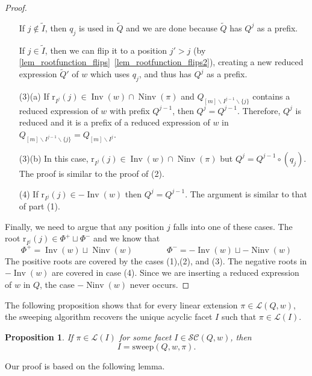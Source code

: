 \documentclass{amsart}
\newtheorem{proposition}[theorem]{Proposition}
\theoremstyle{definition}
\DeclareMathOperator{\Inv}{Inv} %
\DeclareMathOperator{\Ninv}{Ninv} %
\newcommand{\linearExtensions}{\mathcal{L}} %
\newcommand{\subwordComplex}{\mathcal{SC}} %
\newcommand{\rootFunction}[2]{\mathrm{r}_{#1}(#2)} %
\newcommand{\sweepingAlgorithm}{\mathrm{sweep}} %
\begin{document}
\begin{proof}
\begin{enumerate}
    If $j\notin \widetilde I$, then $q_j$ is used in $\widetilde Q$ and we are done because $\widetilde Q$ has $Q^j$ as a prefix.

    If $j\in \widetilde I$, then we can flip it to a position $j'>j$ (by \cref{lem_rootfunction_flips}~\eqref{lem_rootfunction_flips2}), creating a new reduced expression $\widetilde Q'$ of $w$ which uses $q_j$, and thus has $Q^j$ as a prefix.


    \item[(3)(a)] If $\rootFunction{I^j}{j}\in \Inv(w) \cap \Ninv (\pi)$ and $Q_{[m]\smallsetminus I^{j-1}\smallsetminus \{j\}}$ contains a reduced expression of $w$ with prefix $Q^{j-1}$, then $Q^j=Q^{j-1}$.
    Therefore, $Q^j$ is reduced and it is a prefix of a reduced expression of $w$ in 
    $Q_{[m]\smallsetminus I^{j-1}\smallsetminus \{j\}}=Q_{[m]\smallsetminus I^j}$.

    \item[(3)(b)] In this case, $\rootFunction{I^j}{j}\in \Inv(w) \cap \Ninv (\pi)$ but $Q^j= Q^{j-1}\circ (q_j)$. The proof is similar to the proof of (2).

    \item[(4)] If $\rootFunction{I^j}{j}\in -\Inv(w)$ then $Q^j=Q^{j-1}$. The argument is similar to that of part (1).
    \end{enumerate}

Finally, we need to argue that any position $j$ falls into one of these cases.
The root $\rootFunction{I^j}{j}\in \Phi^+ \sqcup \Phi^-$ and we know that
\[
\Phi^+ = \Inv(w) \sqcup \Ninv(w) \qquad \qquad
\Phi^- = -\Inv(w) \sqcup -\Ninv(w)  
\]
The positive roots are covered by the cases (1),(2), and (3).
The negative roots in $-\Inv(w)$ are covered in case (4).
Since we are inserting a reduced expression of $w$ in $Q$, the case $-\Ninv(w)$ never occurs. 
\end{proof}

The following proposition shows that for every linear extension $\pi \in \linearExtensions(Q,w)$, the sweeping algorithm recovers the unique acyclic facet $I$ such that $\pi \in \linearExtensions(I)$.

\begin{proposition}
\label{prop_sweeping2}
    If $\pi\in \linearExtensions(I)$ for some facet $I\in \subwordComplex(Q,w)$, then 
    \[
I = \sweepingAlgorithm(Q,w,\pi).
    \]
\end{proposition}

Our proof is based on the following lemma.
\end{document}
